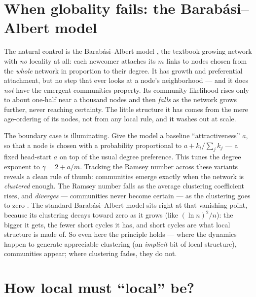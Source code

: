 \section{When globality fails: the Barab\'asi--Albert model}

The natural control is the Barab\'asi--Albert model \citep{barabasi1999}, the
textbook growing network with \emph{no} locality at all: each newcomer attaches
its $m$ links to nodes chosen from the \emph{whole} network in proportion to
their degree. It has growth and preferential attachment, but no step that ever
looks at a node's neighborhood --- and it does \emph{not} have the emergent
communities property. Its community likelihood rises only to about one-half near
a thousand nodes and then \emph{falls} as the network grows further, never
reaching certainty. The little structure it has comes from the mere age-ordering
of its nodes, not from any local rule, and it washes out at scale.

The boundary case is illuminating. Give the model a baseline ``attractiveness''
$a$, so that a node is chosen with a probability proportional to $a +
k_i/\sum_j k_j$ --- a fixed head-start $a$ on top of the usual degree preference.
This tunes the degree exponent to $\gamma=2+a/m$. Tracking the Ramsey number
across these variants reveals a clean rule of thumb: communities emerge exactly
when the network is \emph{clustered} enough. The Ramsey number falls as the
average clustering coefficient rises, and \emph{diverges} --- communities never
become certain --- as the clustering goes to zero \citep{vazquezcommunities2025}. The standard Barab\'asi--Albert
model sits right at that vanishing point, because its clustering decays toward
zero as it grows (like $(\ln n)^2/n$): the bigger it gets, the fewer short cycles
it has, and short cycles are what local structure is made of. So even here the
principle holds --- where the dynamics happen to generate appreciable clustering
(an \emph{implicit} bit of local structure), communities appear; where clustering
fades, they do not.

\section{How local must ``local'' be?}

